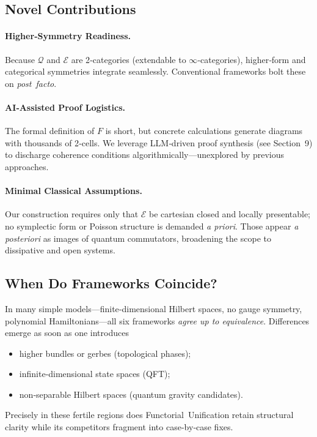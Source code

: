 \subsection{Novel Contributions}
\paragraph{Higher‑Symmetry Readiness.}
Because $\mathcal Q$ and $\mathcal E$ are 2‑categories (extendable to
$\infty$‑categories), higher‑form and categorical symmetries integrate
seamlessly.  Conventional frameworks bolt these on
\emph{post facto}.

\paragraph{AI‑Assisted Proof Logistics.}
The formal definition of $F$ is short, but concrete calculations
generate diagrams with thousands of 2‑cells.  
We leverage LLM‑driven proof synthesis (see Section~9) to discharge
coherence conditions algorithmically—unexplored by previous approaches.

\paragraph{Minimal Classical Assumptions.}
Our construction requires only that $\mathcal E$ be cartesian closed and
locally presentable; no symplectic form or Poisson structure is demanded
\emph{a priori}.  Those appear \emph{a posteriori} as images of quantum
commutators, broadening the scope to dissipative and open systems.

\subsection{When Do Frameworks Coincide?}
In many simple models—finite‐dimensional Hilbert spaces, no gauge
symmetry, polynomial Hamiltonians—all six frameworks \emph{agree up to
equivalence}.  Differences emerge as soon as one introduces
\begin{itemize}
  \item higher bundles or gerbes (topological phases);
  \item infinite‑dimensional state spaces (QFT);
  \item non‑separable Hilbert spaces (quantum gravity candidates).
\end{itemize}
Precisely in these fertile regions does Functorial Unification retain
structural clarity while its competitors fragment into case‑by‑case fixes.

